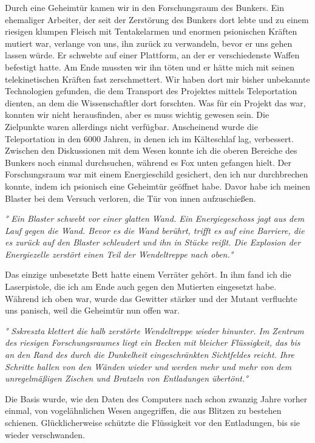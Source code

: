 \documentclass[11pt]{scrartcl}
\begin{document}
Durch eine Geheimtür kamen wir in den Forschungsraum des Bunkers. Ein
ehemaliger Arbeiter, der seit der Zerstörung des Bunkers dort lebte und
zu einem riesigen klumpen Fleisch mit Tentakelarmen und enormen
psionischen Kräften mutiert war, verlange von uns, ihn zurück zu
verwandeln, bevor er uns gehen lassen würde. Er schwebte auf einer
Plattform, an der er verschiedenste Waffen befestigt hatte. Am Ende
mussten wir ihn töten und er hätte mich mit seinen telekinetischen
Kräften fast zerschmettert. Wir haben dort mir bisher unbekannte
Technologien gefunden, die dem Transport des Projektes mittels
Teleportation dienten, an dem die Wissenschaftler dort forschten. Was
für ein Projekt das war, konnten wir nicht herausfinden, aber es muss
wichtig gewesen sein. Die Zielpunkte waren allerdings nicht verfügbar.
Anscheinend wurde die Teleportation in den 6000 Jahren, in denen ich im
Kälteschlaf lag, verbessert.\\ Zwischen den Diskussionen mit dem Wesen
konnte ich die oberen Bereiche des Bunkers noch einmal durchsuchen,
während es Fox unten gefangen hielt. Der Forschungsraum war mit einem
Energieschild gesichert, den ich nur durchbrechen konnte, indem ich
psionisch eine Geheimtür geöffnet habe. Davor habe ich meinen Blaster
bei dem Versuch verloren, die Tür von innen aufzuschießen.

\emph{° Ein Blaster schwebt vor einer glatten Wand. Ein Energiegeschoss
jagt aus dem Lauf gegen die Wand. Bevor es die Wand berührt, trifft es
auf eine Barriere, die es zurück auf den Blaster schleudert und ihn in
Stücke reißt. Die Explosion der Energiezelle zerstört einen Teil der
Wendeltreppe nach oben.°}

Das einzige unbesetzte Bett hatte einem Verräter gehört. In ihm fand ich
die Laserpistole, die ich am Ende auch gegen den Mutierten eingesetzt
habe. Während ich oben war, wurde das Gewitter stärker und der Mutant
verfluchte uns panisch, weil die Geheimtür nun offen war.

\emph{° Sskreszta klettert die halb zerstörte Wendeltreppe wieder
hinunter. Im Zentrum des riesigen Forschungsraumes liegt ein Becken mit
bleicher Flüssigkeit, das bis an den Rand des durch die Dunkelheit
eingeschränkten Sichtfeldes reicht. Ihre Schritte hallen von den Wänden
wieder und werden mehr und mehr von dem unregelmäßigen Zischen und
Bratzeln von Entladungen übertönt.°}

Die Basis wurde, wie den Daten des Computers nach schon zwanzig Jahre
vorher einmal, von vogelähnlichen Wesen angegriffen, die aus Blitzen zu
bestehen schienen. Glücklicherweise schützte die Flüssigkeit vor den
Entladungen, bis sie wieder verschwanden.
\end{document}
